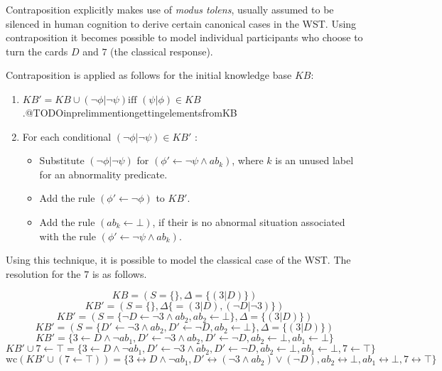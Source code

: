 Contraposition explicitly makes use of \textit{modus tolens}, usually assumed to be silenced in human cognition to derive certain canonical cases in the WST. Using contraposition it becomes possible to model individual participants who choose to turn the cards $D$ and $7$ (the classical response).

Contraposition is applied as follows for the initial knowledge base $KB$:
\begin{enumerate}
\item $KB'=KB\cup(\lnot \phi|\lnot \psi) \textrm{iff } (\psi|\phi)\in KB$.@TODOinprelimmentiongettingelementsfromKB
\item For each conditional $(\lnot \phi| \lnot \psi)\in KB'$ :
\begin{itemize}
\item Substitute $(\lnot \phi| \lnot \psi)$ for $(\phi' \leftarrow \lnot \psi \land \textit{ab}_k)$, where $k$ is an unused label for an abnormality predicate.
\item Add the rule $(\phi' \leftarrow \lnot \phi)$ to $KB'$.
\item Add the rule $(\textit{ab}_k\leftarrow \bot)$, if their is no abnormal situation associated with the rule $(\phi' \leftarrow \lnot \psi \land \textit{ab}_k)$.
\end{itemize}
\end{enumerate}

Using this technique, it is possible to model the classical case of the WST. The resolution for the $7$ is as follows.

\[
KB = (S=\{\},\Delta=\{(3|D)\})
\]
\[
KB' = (S=\{\},\Delta\{=(3|D),(\lnot D|\lnot 3)\})
\]
\[
KB' = (S=\{\lnot D \leftarrow \lnot 3 \land ab_2, ab_2\leftarrow \bot\}, \Delta=\{(3|D)\})
\]
\[
KB' = (S=\{D' \leftarrow \lnot 3 \land ab_2, D' \leftarrow \lnot D, ab_2\leftarrow \bot\}, \Delta=\{(3|D)\})
\]
\[
KB' = \{3 \leftarrow D \land \lnot ab_1, D' \leftarrow \lnot 3 \land ab_2, D' \leftarrow \lnot D,  ab_2\leftarrow \bot, ab_1\leftarrow \bot\}
\]
\[
KB'\cup 7\leftarrow\top = \{3 \leftarrow D \land \lnot ab_1, D' \leftarrow \lnot 3 \land ab_2, D' \leftarrow \lnot D,  ab_2\leftarrow \bot, ab_1\leftarrow \bot, 7\leftarrow\top \}
\]
\begin{equation} \label{eqn:wst_contra}
\textrm{wc} (KB'\cup (7\leftarrow\top)) = \{3 \leftrightarrow D \land \lnot ab_1, D' \leftrightarrow (\lnot 3 \land ab_2) \lor (\lnot D),  ab_2\leftrightarrow \bot, ab_1\leftrightarrow \bot, 7\leftrightarrow\top \}
\end{equation}

